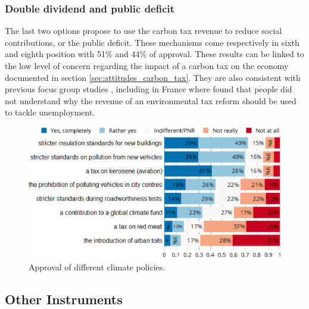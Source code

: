 \documentclass[english,5p,authoryear]{elsarticle}
\begin{document}
        \subsubsection{Double dividend and public deficit}

The last two options propose to use the carbon tax revenue to reduce social contributions, or the public deficit. These mechanisms come respectively in sixth and eighth position with 51\% and 44\% of approval. These results can be linked to the low level of concern regarding the impact of a carbon tax on the economy documented in section \ref{sec:attitudes_carbon_tax}. They are also consistent with previous focus group studies \citep[e.g.][]{kallbekken_aasen_2010}, including in France where \citet{deroubaix_rise_2006} found that people did not understand why the revenue of an environmental tax reform should be used to tackle unemployment.


\begin{figure}[t]
\centering
\includegraphics[width=\columnwidth]{Images_EPS/environmental_policies.eps}
\caption{Approval of different climate policies.}
\label{fig:policies}
\end{figure}

    \subsection{Other Instruments}

\end{document}
